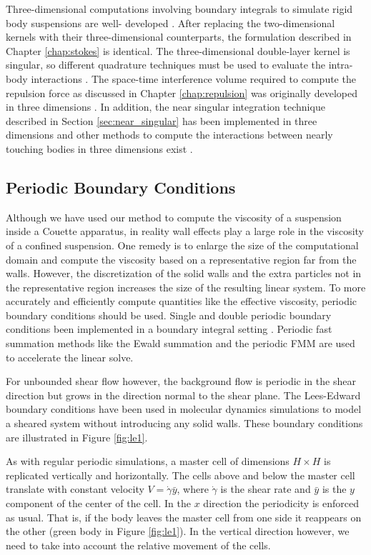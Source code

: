 Three-dimensional computations involving boundary integrals to simulate rigid body suspensions are well- developed  \cite{Mammoli2006, Corona2017 }. After replacing the two-dimensional kernels with their three-dimensional counterparts, the formulation described in Chapter \ref{chap:stokes} is identical. The three-dimensional double-layer kernel is singular, so different quadrature techniques must be used to evaluate the intra-body interactions \cite{Bremer2012}. The space-time interference volume required to compute the repulsion force  as discussed in Chapter \ref{chap:repulsion} was originally developed in three dimensions \cite{Harmon2011}. In addition, the near singular integration technique described in Section \ref{sec:near_singular} has been implemented in three dimensions \cite{Ying2006} and other methods to compute the interactions between nearly touching bodies in three dimensions exist \cite{Klinteberg2016,Siegel2018}.

\subsection{Periodic Boundary Conditions}

Although we have used our method to compute the viscosity of a suspension inside a Couette apparatus, in reality wall effects play a large role in the viscosity of a confined suspension. One remedy is to enlarge the size of the computational domain and compute the viscosity based on a representative region far from the walls. However, the discretization of the solid walls and the extra particles not in the representative region increases the size of the resulting linear system. To more accurately and efficiently compute quantities like the effective viscosity, periodic boundary conditions should be used. Single and double periodic boundary conditions been implemented in a boundary integral setting \cite{Klinteberg2014,Marple2015}. Periodic fast summation methods like the Ewald summation \cite{Ewald1921} and the periodic FMM \cite{Marple2015, Yan2018} are used to accelerate the linear solve. 

For unbounded shear flow however, the background flow is periodic in the shear direction but grows in the direction normal to the shear plane. The Lees-Edward boundary conditions \cite{Lees1972} have been used in molecular dynamics simulations to model a sheared system without introducing any solid walls. These boundary conditions are illustrated in Figure \ref{fig:le1}. 

As with regular periodic simulations, a master cell of dimensions $H\times H$ is replicated vertically and horizontally. The cells above and below the master cell translate with constant velocity $V = \dot{\gamma}\bar{y}$, where $\dot{\gamma}$ is the shear rate and $\bar{y}$ is the $y$ component of the center of the cell. In the $x$ direction the periodicity is enforced as usual. That is, if the body leaves the master cell from one side it reappears on the other (green body in Figure \ref{fig:le1}). In the vertical direction however, we need to take into account the relative movement of the cells. 


